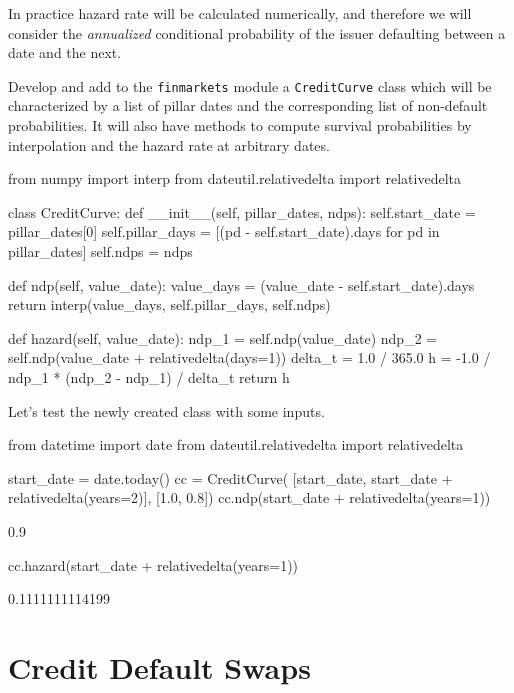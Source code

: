 In practice hazard rate will be calculated numerically, and therefore we will consider the \emph{annualized} conditional probability of the issuer defaulting between a date and the next.

\begin{finmarkets}
Develop and add to the \texttt{finmarkets} module a \texttt{CreditCurve} class which will be characterized by a list of pillar dates and the corresponding list of non-default probabilities. It will also have methods to compute survival probabilities by interpolation and the hazard rate at arbitrary dates.
\end{finmarkets}
  
\begin{ipython}
from numpy import interp
from dateutil.relativedelta import relativedelta

class CreditCurve:
    def __init__(self, pillar_dates, ndps):
        self.start_date = pillar_dates[0]
        self.pillar_days = [(pd - self.start_date).days for pd in pillar_dates]
        self.ndps = ndps
    
    def ndp(self, value_date):
        value_days = (value_date - self.start_date).days
        return interp(value_days, self.pillar_days, self.ndps)

    def hazard(self, value_date):
        ndp_1 = self.ndp(value_date)
        ndp_2 = self.ndp(value_date + relativedelta(days=1))
        delta_t = 1.0 / 365.0
        h = -1.0 / ndp_1 * (ndp_2 - ndp_1) / delta_t
        return h
\end{ipython}
\noindent
Let's test the newly created class with some inputs.
\begin{ipython}
from datetime import date
from dateutil.relativedelta import relativedelta

start_date = date.today()
cc = CreditCurve(
    [start_date, start_date + relativedelta(years=2)],
    [1.0, 0.8])
cc.ndp(start_date + relativedelta(years=1))
\end{ipython}
\begin{ioutput}
0.9
\end{ioutput}
\begin{ipython}
cc.hazard(start_date + relativedelta(years=1))
\end{ipython}
\begin{ioutput}
0.1111111114199
\end{ioutput}
            
\section{Credit Default Swaps}\label{credit-deafult-swaps}

